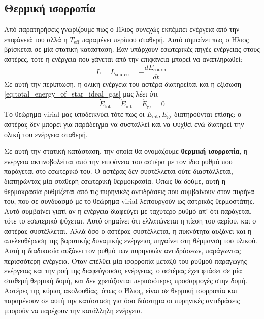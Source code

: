 \subsection{Θερμική ισορροπία}
Από παρατηρήσεις γνωρίζουμε πως ο Ήλιος συνεχώς εκπέμπει ενέργεια από την επιφάνειά του αλλά η $T_{\text{eff}}$ παραμένει περίπου σταθερή. Αυτό σημαίνει πως ο Ήλιος βρίσκεται σε μία στατική κατάσταση.
Εαν υπάρχουν εσωτερικές πηγές ενέργειας στους αστέρες, τότε η ενέργεια που χάνεται από την επιφάνεια μπορεί να αναπληρωθεί:
$$L = L_{\text{source}} = - \frac{dE_{\text{source}}}{dt}$$
Σε αυτή την περίπτωση, η ολική ενέργεια του αστέρα διατηρείται και η εξίσωση \eqref{eq:total_energy_of_star_ideal_gas} μας λέει ότι
$$\Dot{E}_{\text{tot}} = \Dot{E}_{\text{int}} = \Dot{E}_{\text{gr}} = 0$$
Το θεώρημα virial μας υποδεικνύει τότε πως οι $E_{\text{int}}, E_{\text{gr}}$ διατηρούνται επίσης: ο αστέρας δεν μπορεί για παράδειγμα να συσταλλεί και να ψυχθεί ενώ διατηρεί την ολική του ενέργεια σταθερή.

Σε αυτή την στατική κατάσταση, την οποία θα ονομάζουμε \textbf{θερμική ισορροπία}, η ενέργεια ακτινοβολείται από την επιφάνεια του αστέρα με τον ίδιο ρυθμό που παράγεται στο εσωτερικό του. Ο αστέρας δεν συστέλλεται ούτε διαστάλλεται, διατηρώντας μία σταθερή εσωτερική θερμοκρασία. Όπως θα δούμε, αυτή η θερμοκρασία ρυθμίζεται από τις πυρηνικές αντιδράσεις που συμβαίνουν στον πυρήνα του, που σε συνδυασμό με το θεώρημα virial λειτουργούν ως αστρικός θερμοστάτης. Αυτό συμβαίνει γιατί αν η ενέργεια διαφεύγει με ταχύτερο ρυθμό απ' ότι παράγεται, τότε το εσωτερικό ψύχεται. Αυτό σημαίνει ότι ελλατώνεται η πίεση του αερίου, και ο αστέρας συστέλλεται. Αλλά όσο ο αστέρας συστέλλεται, η πυκνότητα αυξάνει και η απελευθέρωση της βαρυτικής δυναμικής ενέργειας πηγαίνει στη θέρμανση του υλικού. Αυτή η διαδικασία αυξάνει τον ρυθμό των πυρηνικών αντιδράσεων, παράγωντας περισσότερη ενέργεια. Όταν επέλθει μία ισορροπία μεταξύ του ρυθμού παραγωγής ενέργειας και την ροή της διαφεύγουσας ενέργειας, ο αστέρας έχει φτάσει σε μία σταθερή θερμική δομή, και δεν χρειάζονται περισσότερες προσαρμογές στην δομή.
Αστέρες της κύριας ακολουθίας, όπως ο Ήλιος, είναι σε θερμική ισορροπία και παραμένουν σε αυτή την κατάσταση για όσο διάστημα οι πυρηνικές αντιδράσεις μπορούν να παρέχουν την κατάλληλη ενέργεια.

